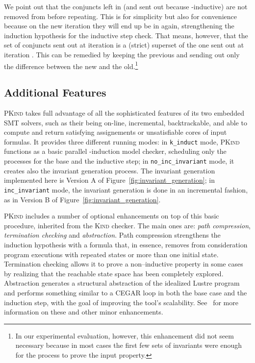 \documentclass[submission,copyright,creativecommons]{eptcs}
\newcommand{\Kind}{\textrm{\textsc{Kind}}\xspace}
\newcommand{\PKind}{\textrm{\textsc{PKind}}\xspace}
\begin{document}
We point out that 
the conjuncts left in  (and sent out because -inductive) are
not removed from  before repeating.
This is for simplicity but also for convenience 
because on the new iteration they will end up be in  again,
strengthening the induction hypothesis for the inductive step check.
That means, however, that the set of conjuncts sent out 
at iteration  is a (strict) superset of the one sent out at
iteration . 
This can be remedied by keeping the previous  and
sending out only the difference between the new  and the old.\footnote{
In our experimental evaluation, however, this enhancement 
did not seem necessary 
because in most cases the first few sets of invariants were 
enough for the process  to prove 
the input property.
}


\vspace{-0.4cm}
\subsection{Additional Features}


\PKind takes full advantage of all the sophisticated features of its
two embedded SMT solvers, such as their being on-line, incremental,
backtrackable, and able to compute and return satisfying assignements
or unsatisfiable cores of input formulas.  
It provides three
different running modes:
in \texttt{\small k\_induct} mode, \PKind
functions as a basic parallel -induction model checker, scheduling
only the processes for the base and the inductive step;
in
\texttt{\small no\_inc\_invariant} mode, it creates also the invariant
generation process. The invariant generation implemented here is
Version A of Figure~\ref{fig:invariant_generation};
in \texttt{\small
  inc\_invariant} mode, the invariant generation is done in an
incremental fashion, as in Version B of
Figure~\ref{fig:invariant_generation}.

\PKind includes a number of optional enhancements on top of this basic
procedure,
inherited from the \Kind checker.
The main ones are: \textit{path compression},
\textit{termination checking} and \textit{abstraction}.  Path
compression strengthens the induction hypothesis with a formula that,
in essence, removes from consideration program executions with
repeated states or more than one initial state.  Termination checking
allows it to prove a non--inductive property in some
cases by realizing that the reachable state space has been completely
explored.  Abstraction generates a structural abstraction of the
idealized Lustre program and performs something similar to a CEGAR
loop in both the base case and the induction step, with the goal of
improving the tool's scalability.  
See~\cite{hagen08} for more
information on these and other minor enhancements.
\end{document}
